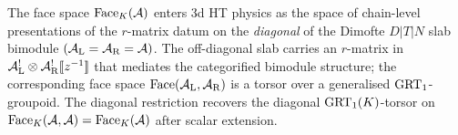 \begin{remark}
\label{rem:grt-slab-bimodule-scope}
The face space $\mathrm{Face}_K(\mathcal{A})$ enters 3d HT physics as the space of
chain-level presentations of the $r$-matrix datum on the
\emph{diagonal} of the Dimofte $D|T|N$ slab bimodule
$(\mathcal{A}_{\mathrm{L}} = \mathcal{A}_{\mathrm{R}} = \mathcal{A})$. The off-diagonal slab
carries an $r$-matrix in
$\mathcal{A}_{\mathrm{L}}^{!}\otimes\mathcal{A}_{\mathrm{R}}^{!}[\![z^{-1}]\!]$ that
mediates the categorified bimodule structure; the corresponding
face space $\mathrm{Face}(\mathcal{A}_{\mathrm{L}}, \mathcal{A}_{\mathrm{R}})$ is a torsor
over a generalised $\mathrm{GRT}_1$-groupoid. The diagonal restriction
recovers the diagonal $\mathrm{GRT}_1(K)$-torsor on
$\mathrm{Face}_K(\mathcal{A}, \mathcal{A}) = \mathrm{Face}_K(\mathcal{A})$ after scalar extension.
\end{remark}

